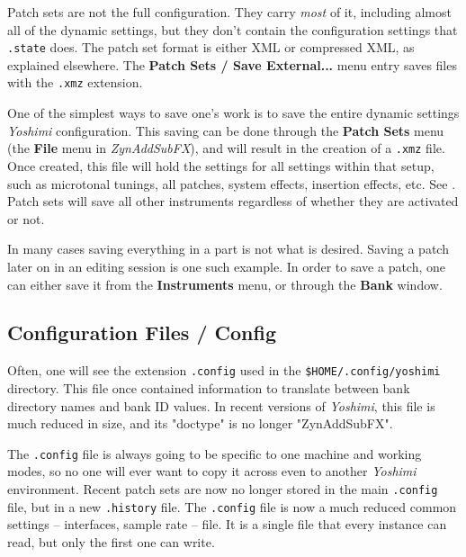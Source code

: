    Patch sets are not the full configuration. They carry \textsl{most} of it,
   including almost all of the dynamic settings, but they don't contain the
   configuration settings that \texttt{.state} does.  The patch set format is
   either XML or compressed XML, as explained elsewhere.  The
   \textbf{Patch Sets / Save External...} menu entry saves files with
   the \texttt{.xmz} extension.

   One of the simplest ways to save one's work is to save the entire
   dynamic settings \textsl{Yoshimi} configuration.
   This saving can be done through the \textbf{Patch Sets} menu
   (the \textbf{File} menu in \textsl{ZynAddSubFX}),
   and will result in the creation of
   a \texttt{.xmz} file. Once created, this file will hold the settings for
   all settings within that setup, such as microtonal tunings, all
   patches, system effects, insertion effects, etc.
   See .
   Patch sets will save all other instruments regardless of whether they are
   activated or not.

   In many cases saving everything in a part is not what is desired.
   Saving a patch later on in an editing session is one such example.
   In order to save a patch, one can either save it from the
   \textbf{Instruments} menu, or through the \textbf{Bank} window.

\subsection{Configuration Files / Config}
\label{subsec:configuration_config}

   Often, one will see the extension \texttt{.config} used in the
   \texttt{\$HOME/.config/yoshimi} directory.  This file once contained
   information to translate between bank directory names and bank ID
   values.  In recent versions of \textsl{Yoshimi}, this file is much
   reduced in size, and its "doctype" is no longer "ZynAddSubFX".

   The \texttt{.config} file is always going to be specific to one machine and
   working modes, so no one will ever want to copy it across even to another
   \textsl{Yoshimi} environment.  Recent patch sets are now no longer stored in
   the main \texttt{.config} file, but in a new \texttt{.history} file.  The
   \texttt{.config} file is now a much reduced common settings -- interfaces,
   sample rate -- file.  It is a single file that every instance can read, but
   only the first one can write.

